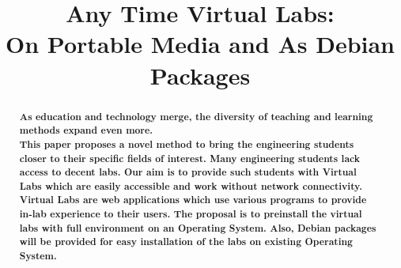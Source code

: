 \documentclass[conference]{IEEEtran}
\begin{document}
\title{Any Time Virtual Labs: \\ On Portable Media and As Debian Packages}


\author{
\and
{}
}

\maketitle


\begin{abstract}
\textbf{As education and technology merge, the diversity of teaching and learning methods expand even more.\\
  This paper proposes a novel method to bring the engineering students closer to their specific fields of interest. Many engineering students lack access to decent labs. Our aim is to provide such students with Virtual Labs which are easily accessible and work without network connectivity.\\
  Virtual Labs are web applications which use various programs to provide in-lab experience to their users. The proposal is to preinstall the virtual labs with full environment on an Operating System. Also, Debian packages will be provided for easy installation of the labs on existing Operating System.
}     
\end{abstract}

\IEEEpeerreviewmaketitle
\end{document}
